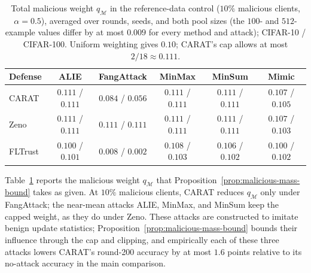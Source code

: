 \begin{table}[!htbp]
  \centering
  \caption{Total malicious weight $q_{\mathcal{M}}$ in the reference-data control ($10\%$ malicious clients, $\alpha=0.5$), averaged over rounds, seeds, and both pool sizes (the $100$- and $512$-example values differ by at most $0.009$ for every method and attack); CIFAR-10 / CIFAR-100. Uniform weighting gives $0.10$; CARAT's cap allows at most $2/18\approx0.111$.}
  \label{tab:malicious-weight}
  \small
  \setlength{\tabcolsep}{4pt}
  \begin{tabular}{lccccc}
  \toprule
  Defense & ALIE & FangAttack & MinMax & MinSum & Mimic \\
  \midrule
  CARAT & $0.111$ / $0.111$ & $0.084$ / $0.056$ & $0.111$ / $0.111$ & $0.111$ / $0.111$ & $0.107$ / $0.105$ \\
  Zeno & $0.111$ / $0.111$ & $0.111$ / $0.111$ & $0.111$ / $0.111$ & $0.111$ / $0.111$ & $0.107$ / $0.103$ \\
  FLTrust & $0.100$ / $0.101$ & $0.008$ / $0.002$ & $0.108$ / $0.103$ & $0.106$ / $0.102$ & $0.100$ / $0.102$ \\
  \bottomrule
  \end{tabular}
\end{table}

Table~\ref{tab:malicious-weight} reports the malicious weight $q_{\mathcal{M}}$ that Proposition~\ref{prop:malicious-mass-bound} takes as given. At $10\%$ malicious clients, CARAT reduces $q_{\mathcal{M}}$ only under FangAttack; the near-mean attacks ALIE, MinMax, and MinSum keep the capped weight, as they do under Zeno. These attacks are constructed to imitate benign update statistics; Proposition~\ref{prop:malicious-mass-bound} bounds their influence through the cap and clipping, and empirically each of these three attacks lowers CARAT's round-200 accuracy by at most $1.6$ points relative to its no-attack accuracy in the main comparison.

